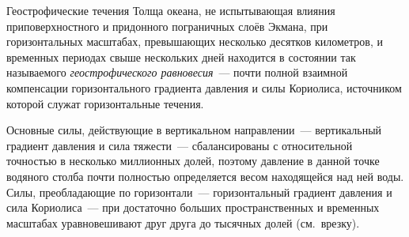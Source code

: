 
\begin{chapter}{Геострофические течения}\label{chap:10}
Толща океана, не испытывающая влияния приповерхностного и придонного 
пограничных слоёв Экмана, при горизонтальных масштабах,
превышающих несколько десятков километров, и временных периодах свыше 
нескольких дней находится в состоянии так называемого
\emph{геострофического равновесия}~--- 
почти полной взаимной компенсации горизонтального градиента давления 
и силы Кориолиса, источником которой служат горизонтальные течения.
%

Основные силы, действующие в вертикальном направлении~--- вертикальный
градиент давления и сила тяжести~--- сбалансированы с относительной
точностью в несколько миллионных долей, поэтому давление в данной точке
водяного столба почти полностью определяется весом находящейся над ней воды.
Силы, преобладающие по горизонтали~--- горизонтальный градиент давления и сила
Кориолиса~--- при достаточно больших пространственных и временных масштабах 
уравновешивают друг друга до тысячных долей (см.\ врезку).
%


\end{chapter}
